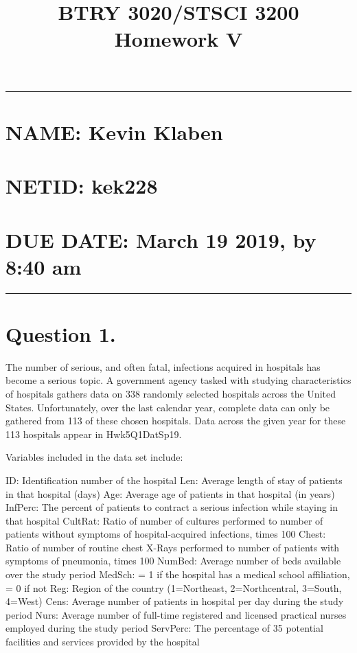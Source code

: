 \documentclass[]{article}
\title{BTRY 3020/STSCI 3200 Homework V}
\author{}
\date{}
\begin{document}
\maketitle

\begin{center}\rule{0.5\linewidth}{\linethickness}\end{center}

\section{NAME: Kevin Klaben}\label{name-kevin-klaben}

\section{NETID: kek228}\label{netid-kek228}

\section{\texorpdfstring{\textbf{DUE DATE: March 19 2019, by 8:40
am}}{DUE DATE: March 19 2019, by 8:40 am}}\label{due-date-march-19-2019-by-840-am}

\begin{center}\rule{0.5\linewidth}{\linethickness}\end{center}

\section{Question 1.}\label{question-1.}

The number of serious, and often fatal, infections acquired in hospitals
has become a serious topic. A government agency tasked with studying
characteristics of hospitals gathers data on 338 randomly selected
hospitals across the United States. Unfortunately, over the last
calendar year, complete data can only be gathered from 113 of these
chosen hospitals. Data across the given year for these 113 hospitals
appear in Hwk5Q1DatSp19.

Variables included in the data set include:

ID: Identification number of the hospital Len: Average length of stay of
patients in that hospital (days) Age: Average age of patients in that
hospital (in years) InfPerc: The percent of patients to contract a
serious infection while staying in that hospital CultRat: Ratio of
number of cultures performed to number of patients without symptoms of
hospital-acquired infections, times 100 Chest: Ratio of number of
routine chest X-Rays performed to number of patients with symptoms of
pneumonia, times 100 NumBed: Average number of beds available over the
study period MedSch: = 1 if the hospital has a medical school
affiliation, = 0 if not Reg: Region of the country (1=Northeast,
2=Northcentral, 3=South, 4=West) Cens: Average number of patients in
hospital per day during the study period Nurs: Average number of
full-time registered and licensed practical nurses employed during the
study period ServPerc: The percentage of 35 potential facilities and
services provided by the hospital
\end{document}
